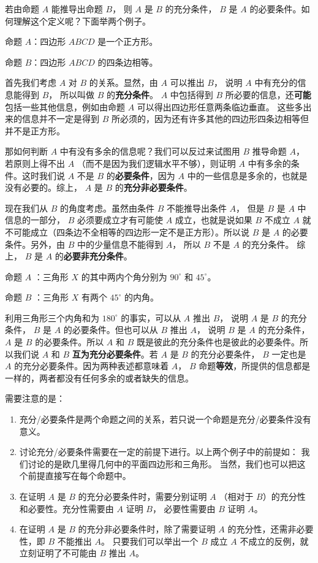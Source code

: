 若由命题 $A$ 能推导出命题 $B$， 则 $A$ 是 $B$ 的充分条件， $B$ 是 $A$ 的必要条件。如何理解这个定义呢？下面举两个例子。

\begin{example}{}
命题 $A$：四边形 $ABCD$ 是一个正方形。

命题 $B$：四边形 $ABCD$ 的四条边相等。

首先我们考虑 $A$ 对 $B$ 的关系。显然，由 $A$ 可以推出 $B$， 说明 $A$ 中有充分的信息能得到 $B$， 所以叫做 $B$ 的\textbf{充分条件}。 $A$ 中包括得到 $B$ 所必要的信息，还\textbf{可能}包括一些其他信息，例如由命题 $A$ 可以得出四边形任意两条临边垂直。 这些多出来的信息并不一定是得到 $B$ 所必须的，因为还有许多其他的四边形四条边相等但并不是正方形。

那如何判断 $A$ 中有没有多余的信息呢？我们可以反过来试图用 $B$ 推导命题 $A$， 若原则上得不出 $A$ （而不是因为我们逻辑水平不够），则证明 $A$ 中有多余的条件。这时我们说 $A$ 不是 $B$ 的\textbf{必要条件}，因为 $A$ 中的一些信息是多余的，也就是没有必要的。综上， $A$ 是 $B$ 的\textbf{充分非必要条件}。

现在我们从 $B$ 的角度考虑。虽然由条件 $B$ 不能推导出条件 $A$， 但是 $B$ 是 $A$ 中信息的一部分， $B$ 必须要成立才有可能使 $A$ 成立，也就是说如果 $B$ 不成立 $A$ 就不可能成立（四条边不全相等的四边形一定不是正方形）。所以说 $B$ 是 $A$ 的必要条件。另外，由 $B$ 中的少量信息不能得到 $A$， 所以 $B$ 不是 $A$ 的充分条件。 综上， $B$ 是 $A$ 的\textbf{必要非充分条件}。
\end{example}


\begin{example}{}
命题 $A$ ：三角形 $X$ 的其中两内个角分别为 $90^\circ$ 和 $45^\circ$。

命题 $B$ ：三角形 $X$ 有两个 $45^\circ$ 的内角。

利用三角形三个内角和为 $180^\circ$ 的事实，可以从 $A$ 推出 $B$， 说明 $A$ 是 $B$ 的充分条件， $B$ 是 $A$ 的必要条件。但也可以从 $B$ 推出 $A$， 说明 $B$ 是 $A$ 的充分条件， $A$ 是 $B$ 的必要条件。所以 $A$ 和 $B$ 既是彼此的充分条件也是彼此的必要条件。所以我们说 $A$ 和 $B$ \textbf{互为充分必要条件}。若 $A$ 是 $B$ 的充分必要条件， $B$ 一定也是 $A$ 的充分必要条件。因为两种表述都意味着 $A$，  $B$ 命题\textbf{等效}，所提供的信息都是一样的，两者都没有任何多余的或者缺失的信息。
\end{example}

需要注意的是：
\begin{enumerate}
\item 充分/必要条件是两个命题之间的关系，若只说一个命题是充分/必要条件没有意义。
\item 讨论充分/必要条件需要在一定的前提下进行。以上两个例子中的前提如： 我们讨论的是欧几里得几何中的平面四边形和三角形。 当然，我们也可以把这个前提直接写在每个命题中。
\item 在证明 $A$ 是 $B$ 的充分必要条件时，需要分别证明 $A$ （相对于 $B$）的充分性和必要性。充分性需要由 $A$ 证明 $B$， 必要性需要由 $B$ 证明 $A$。 
\item 在证明 $A$ 是 $B$ 的充分非必要条件时，除了需要证明 $A$ 的充分性，还需非必要性，即 $B$ 不能推出 $A$。 只要我们可以举出一个 $B$ 成立 $A$ 不成立的反例，就立刻证明了不可能由 $B$ 推出 $A$。 
\end{enumerate}

